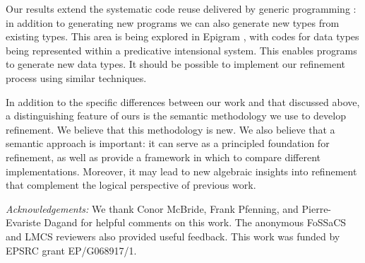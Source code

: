 \documentclass{LMCS}
\begin{document}
Our results extend the systematic code reuse delivered by generic
programming \cite{amm07,bghj07,bdj03}: in addition to generating new
programs we can also generate new types from existing types. This area
is being explored in Epigram \cite{chapman10gentle}, with codes for
data types being represented within a predicative intensional
system. This enables programs to generate new data types. It should be
possible to implement our refinement process using similar techniques.

In addition to the specific differences between our work and that
discussed above, a distinguishing feature of ours is the semantic
methodology we use to develop refinement. We believe that this
methodology is new. We also believe that a semantic approach is
important: it can serve as a principled foundation for refinement, as
well as provide a framework in which to compare different
implementations. Moreover, it may lead to new algebraic insights into
refinement that complement the logical perspective of previous work.

\bigskip

{\em Acknowledgements:} We thank Conor McBride, Frank Pfenning, and
Pierre-Evariste Dagand for helpful comments on this work. The
anonymous FoSSaCS and LMCS reviewers also provided useful
feedback. This work was funded by EPSRC grant EP/G068917/1.




\end{document}
